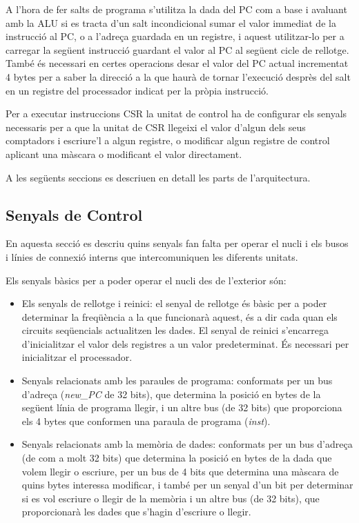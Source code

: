 \documentclass[10pt,a4paper,twocolumn,twoside]{article}
\begin{document}
    A l'hora de fer salts de programa s'utilitza la dada del PC com a base i avaluant amb la ALU si es tracta d'un salt incondicional sumar el valor immediat de la instrucció al PC, o a l'adreça guardada en un registre, i aquest utilitzar-lo per a carregar la següent instrucció guardant el valor al PC al següent cicle de rellotge. També és necessari en certes operacions desar el valor del PC actual incrementat 4 bytes per a saber la direcció a la que haurà de tornar l'execució desprès del salt en un registre del processador indicat per la pròpia instrucció.
    
    Per a executar instruccions CSR la unitat de control ha de configurar els senyals necessaris per a que la unitat de CSR llegeixi el valor d'algun dels seus comptadors i escriure'l a algun registre, o modificar algun registre de control aplicant una màscara o modificant el valor directament.
    
    A les següents seccions es descriuen en detall les parts de l'arquitectura.
    \subsection{Senyals de Control}
    En aquesta secció es descriu quins senyals fan falta per operar el nucli i els busos i línies de connexió interns que intercomuniquen les diferents unitats.
        
        Els senyals bàsics per a poder operar el nucli des de l'exterior són:
        \begin{itemize}
            \item Els senyals de rellotge i reinici: el senyal de rellotge és bàsic per a poder determinar la freqüència a la que funcionarà aquest, és a dir cada quan els circuits seqüencials actualitzen les dades. El senyal de reinici s’encarrega d’inicialitzar el valor dels registres a un valor predeterminat. És necessari per inicialitzar el processador. 
            \item Senyals relacionats amb les paraules de programa: conformats per un bus d'adreça (\textit{new\_PC} de 32 bits), que determina la posició en bytes de la següent línia de programa llegir, i un altre bus (de 32 bits) que proporciona els 4 bytes que conformen una paraula de programa (\textit{inst}).
            \item Senyals relacionats amb la memòria de dades: conformats per un bus d'adreça (de com a molt 32 bits) que determina la posició en bytes de la dada que volem llegir o escriure, per un bus de 4 bits que determina una màscara de quins bytes interessa modificar, i també per un senyal d'un bit per determinar si es vol escriure o llegir de la memòria i un altre bus (de 32 bits), que proporcionarà les dades que s'hagin d'escriure o llegir.
        \end{itemize}
        
\end{document}
